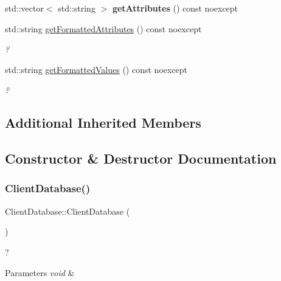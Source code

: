 \begin{DoxyCompactItemize}
\mbox{\label{classdb_1_1_client_database_ab40b26d2ebc7b5f76c38fafaf59c8fb2}} 
std\+::vector$<$ std\+::string $>$ {\bfseries get\+Attributes} () const noexcept
\item 
std\+::string \hyperlink{classdb_1_1_client_database_a930ad117ea6c1f1306f44db8716ab26a}{get\+Formatted\+Attributes} () const noexcept
\begin{DoxyCompactList}\small\item\em ? \end{DoxyCompactList}\item 
std\+::string \hyperlink{classdb_1_1_client_database_a70e9abb4361ecc6a0ea168a63743e093}{get\+Formatted\+Values} () const noexcept
\begin{DoxyCompactList}\small\item\em ? \end{DoxyCompactList}\end{DoxyCompactItemize}
\subsection*{Additional Inherited Members}


\subsection{Constructor \& Destructor Documentation}
\mbox{\label{classdb_1_1_client_database_abdb82edc1ea955df62b5514e40397622}} 
\subsubsection{\texorpdfstring{Client\+Database()}{ClientDatabase()}\hspace{0.1cm}{\footnotesize\ttfamily [1/3]}}
{\footnotesize\ttfamily Client\+Database\+::\+Client\+Database (\begin{DoxyParamCaption}{ }\end{DoxyParamCaption})}



? 


\begin{DoxyParams}{Parameters}
{\em void} & \\
\hline
\end{DoxyParams}
\mbox{\label{classdb_1_1_client_database_ad35c5aec453015e7785079f70fd20bb4}} 
